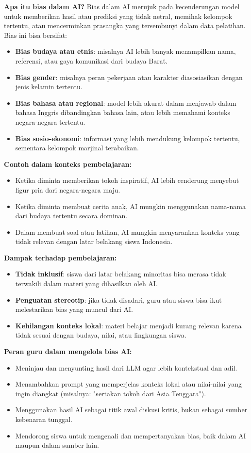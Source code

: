 \textbf{Apa itu bias dalam AI?}  
Bias dalam AI merujuk pada kecenderungan model untuk memberikan hasil atau prediksi yang tidak netral, memihak kelompok tertentu, atau mencerminkan prasangka yang tersembunyi dalam data pelatihan. Bias ini bisa bersifat:
\begin{itemize}
	\item \textbf{Bias budaya atau etnis}: misalnya AI lebih banyak menampilkan nama, referensi, atau gaya komunikasi dari budaya Barat.
	\item \textbf{Bias gender}: misalnya peran pekerjaan atau karakter diasosiasikan dengan jenis kelamin tertentu.
	\item \textbf{Bias bahasa atau regional}: model lebih akurat dalam menjawab dalam bahasa Inggris dibandingkan bahasa lain, atau lebih memahami konteks negara-negara tertentu.
	\item \textbf{Bias sosio-ekonomi}: informasi yang lebih mendukung kelompok tertentu, sementara kelompok marjinal terabaikan.
\end{itemize}

\textbf{Contoh dalam konteks pembelajaran:}
\begin{itemize}
	\item Ketika diminta memberikan tokoh inspiratif, AI lebih cenderung menyebut figur pria dari negara-negara maju.
	\item Ketika diminta membuat cerita anak, AI mungkin menggunakan nama-nama dari budaya tertentu secara dominan.
	\item Dalam membuat soal atau latihan, AI mungkin menyarankan konteks yang tidak relevan dengan latar belakang siswa Indonesia.
\end{itemize}

\textbf{Dampak terhadap pembelajaran:}
\begin{itemize}
	\item \textbf{Tidak inklusif}: siswa dari latar belakang minoritas bisa merasa tidak terwakili dalam materi yang dihasilkan oleh AI.
	\item \textbf{Penguatan stereotip}: jika tidak disadari, guru atau siswa bisa ikut melestarikan bias yang muncul dari AI.
	\item \textbf{Kehilangan konteks lokal}: materi belajar menjadi kurang relevan karena tidak sesuai dengan budaya, nilai, atau lingkungan siswa.
\end{itemize}

\textbf{Peran guru dalam mengelola bias AI:}
\begin{itemize}
	\item Meninjau dan menyunting hasil dari LLM agar lebih kontekstual dan adil.
	\item Menambahkan prompt yang memperjelas konteks lokal atau nilai-nilai yang ingin diangkat (misalnya: "sertakan tokoh dari Asia Tenggara").
	\item Menggunakan hasil AI sebagai titik awal diskusi kritis, bukan sebagai sumber kebenaran tunggal.
	\item Mendorong siswa untuk mengenali dan mempertanyakan bias, baik dalam AI maupun dalam sumber lain.
\end{itemize}

